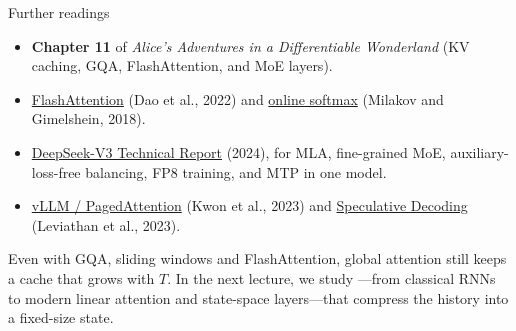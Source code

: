 \documentclass[11pt,aspectratio=169]{beamer}
\begin{document}
\begin{frame}{Further readings}
    \setlength{\parskip}{5pt}

    \begin{itemize}
        \setlength{\itemsep}{2pt}
        \item \textbf{Chapter 11} of \textit{Alice's Adventures in a Differentiable Wonderland} (KV caching, GQA, FlashAttention, and MoE layers).
        \item \href{https://arxiv.org/abs/2205.14135}{FlashAttention} (Dao et al., 2022) and \href{https://arxiv.org/abs/1805.02867}{online softmax} (Milakov and Gimelshein, 2018).
        \item \href{https://arxiv.org/abs/2412.19437}{DeepSeek-V3 Technical Report} (2024), for MLA, fine-grained MoE, auxiliary-loss-free balancing, FP8 training, and MTP in one model.
        \item \href{https://arxiv.org/abs/2309.06180}{vLLM / PagedAttention} (Kwon et al., 2023) and \href{https://arxiv.org/abs/2211.17192}{Speculative Decoding} (Leviathan et al., 2023).
    \end{itemize}

    \smallskip
    Even with GQA, sliding windows and FlashAttention, global attention still
    keeps a cache that grows with $T$. In the next lecture, we study
    ---from classical RNNs to modern linear
    attention and state-space layers---that compress the history into a
    fixed-size state.

\end{frame}
\end{document}
